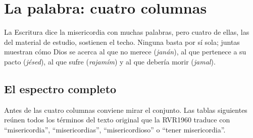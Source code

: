 \section{La palabra: cuatro columnas}

La Escritura dice la misericordia con muchas palabras, pero cuatro de ellas, las del material de estudio, sostienen el techo. Ninguna basta por sí sola; juntas muestran cómo Dios se acerca al que no merece (\emph{janán}), al que pertenece a su pacto (\emph{jésed}), al que sufre (\emph{rajamím}) y al que debería morir (\emph{jamal}).

\subsection{El espectro completo}\label{sec:espectro}
Antes de las cuatro columnas conviene mirar el conjunto. Las tablas siguientes reúnen todos los términos del texto original que la RVR1960 traduce con ``misericordia'', ``misericordias'', ``misericordioso'' o ``tener misericordia''.


